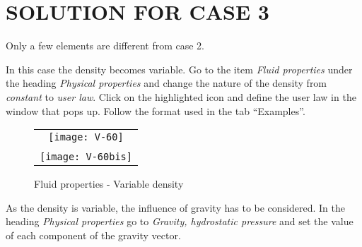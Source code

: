 
%
%
%
%


\section{SOLUTION FOR CASE 3}

Only a few elements are different from case 2.

In this case the density becomes variable. Go to the item
{\itshape Fluid properties} under the heading
{\itshape Physical properties} and change the nature of the density from
{\itshape constant} to {\itshape user law}. Click on the highlighted icon and define the user law in the window that pops up. Follow the format used in the tab ``Examples''.

\begin{figure}[h!]
\begin{center}
\begin{tabular}{c}
\texttt{[image: V-60]} \\
\\
\texttt{[image: V-60bis]}
\end{tabular}
\caption{Fluid properties - Variable density}
\label{fig1_e3}
\end{center}
\end{figure}

\newpage
As the density is variable, the influence of gravity has to be considered. In the
heading {\itshape Physical properties} go to
{\itshape Gravity, hydrostatic pressure} and set the value of each component of
the gravity vector.


